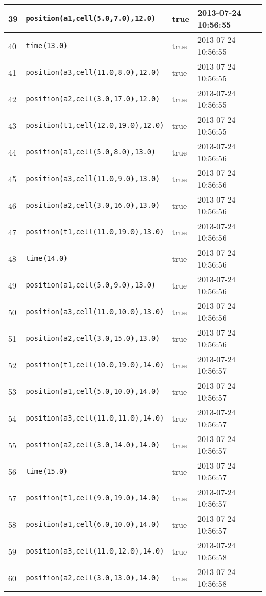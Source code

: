 \documentclass[11pt]{article}\usepackage[utf8]{inputenc}\usepackage{geometry}
\begin{document}
\begin{table}[ht]
\begin{tabular}{l l l l}
39&\texttt{position(a1,cell(5.0,7.0),12.0)}&true&2013-07-24 10:56:55\\ [1ex] \hline
40&\texttt{time(13.0)}&true&2013-07-24 10:56:55\\ [1ex] \hline
41&\texttt{position(a3,cell(11.0,8.0),12.0)}&true&2013-07-24 10:56:55\\ [1ex] \hline
42&\texttt{position(a2,cell(3.0,17.0),12.0)}&true&2013-07-24 10:56:55\\ [1ex] \hline
43&\texttt{position(t1,cell(12.0,19.0),12.0)}&true&2013-07-24 10:56:55\\ [1ex] \hline
44&\texttt{position(a1,cell(5.0,8.0),13.0)}&true&2013-07-24 10:56:56\\ [1ex] \hline
45&\texttt{position(a3,cell(11.0,9.0),13.0)}&true&2013-07-24 10:56:56\\ [1ex] \hline
46&\texttt{position(a2,cell(3.0,16.0),13.0)}&true&2013-07-24 10:56:56\\ [1ex] \hline
47&\texttt{position(t1,cell(11.0,19.0),13.0)}&true&2013-07-24 10:56:56\\ [1ex] \hline
48&\texttt{time(14.0)}&true&2013-07-24 10:56:56\\ [1ex] \hline
49&\texttt{position(a1,cell(5.0,9.0),13.0)}&true&2013-07-24 10:56:56\\ [1ex] \hline
50&\texttt{position(a3,cell(11.0,10.0),13.0)}&true&2013-07-24 10:56:56\\ [1ex] \hline
51&\texttt{position(a2,cell(3.0,15.0),13.0)}&true&2013-07-24 10:56:56\\ [1ex] \hline
52&\texttt{position(t1,cell(10.0,19.0),14.0)}&true&2013-07-24 10:56:57\\ [1ex] \hline
53&\texttt{position(a1,cell(5.0,10.0),14.0)}&true&2013-07-24 10:56:57\\ [1ex] \hline
54&\texttt{position(a3,cell(11.0,11.0),14.0)}&true&2013-07-24 10:56:57\\ [1ex] \hline
55&\texttt{position(a2,cell(3.0,14.0),14.0)}&true&2013-07-24 10:56:57\\ [1ex] \hline
56&\texttt{time(15.0)}&true&2013-07-24 10:56:57\\ [1ex] \hline
57&\texttt{position(t1,cell(9.0,19.0),14.0)}&true&2013-07-24 10:56:57\\ [1ex] \hline
58&\texttt{position(a1,cell(6.0,10.0),14.0)}&true&2013-07-24 10:56:57\\ [1ex] \hline
59&\texttt{position(a3,cell(11.0,12.0),14.0)}&true&2013-07-24 10:56:58\\ [1ex] \hline
60&\texttt{position(a2,cell(3.0,13.0),14.0)}&true&2013-07-24 10:56:58\\ [1ex] \hline

\end{tabular}
\end{table}
\end{document}
